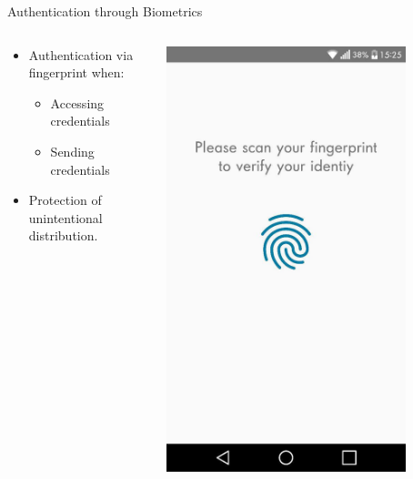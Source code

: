 \documentclass{beamer}
\begin{document}
\begin{frame}{Authentication through Biometrics}
\vspace{-10mm}
	\begin{columns}[onlytextwidth]
		\begin{column}{0.7\textwidth}
			\begin{itemize}
			\item Authentication via fingerprint when: 
			\begin{itemize}
				\item Accessing credentials
				\item Sending credentials
			\end{itemize}
			\item Protection of unintentional distribution.
			\end{itemize}
		\end{column}
		\begin{column}{0.3\textwidth}
			\begin{center}
			\includegraphics[width=0.8\textwidth]{images/AuthenticationScreenNew.jpg} \\
			\end{center}
		\end{column}
	\end{columns}
\end{frame}
\end{document}
